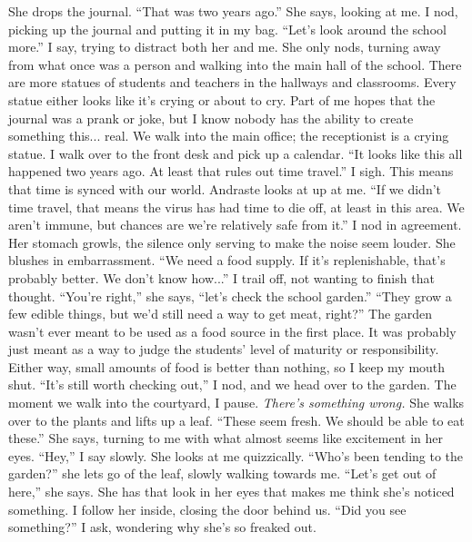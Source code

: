 \documentclass[a4paper, 12pt]{book}
\newcommand\tab[1][1cm]{\hspace*{#1}}
\begin{document}
\tab
She drops the journal. ``That was two years ago.'' She says, looking at me.
\newline
\tab
I nod, picking up the journal and putting it in my bag. ``Let’s look around the school more.'' I say, trying to distract both her and me. She only nods, turning away from what once was a person and walking into the main hall of the school. There are more statues of students and teachers in the hallways and classrooms. Every statue either looks like it’s crying or about to cry. Part of me hopes that the journal was a prank or joke, but I know nobody has the ability to create something this... real. We walk into the main office; the receptionist is a crying statue. I walk over to the front desk and pick up a calendar. ``It looks like this all happened two years ago. At least that rules out time travel.'' I sigh. This means that time is synced with our world.
\newline
\tab
Andraste looks at up at me. ``If we didn’t time travel, that means the virus has had time to die off, at least in this area. We aren’t immune, but chances are we’re relatively safe from it.'' I nod in agreement. Her stomach growls, the silence only serving to make the noise seem louder. She blushes in embarrassment.
\newline
\tab
``We need a food supply. If it’s replenishable, that’s probably better. We don’t know how...'' I trail off, not wanting to finish that thought.
\newline
\tab
``You’re right,'' she says, ``let’s check the school garden.''
\newline
\tab
``They grow a few edible things, but we’d still need a way to get meat, right?'' The garden wasn’t ever meant to be used as a food source in the first place. It was probably just meant as a way to judge the students’ level of maturity or responsibility. Either way, small amounts of food is better than nothing, so I keep my mouth shut.
\newline
\tab
``It’s still worth checking out,'' I nod, and we head over to the garden. The moment we walk into the courtyard, I pause. \textit{There’s something wrong.} She walks over to the plants and lifts up a leaf. ``These seem fresh. We should be able to eat these.'' She says, turning to me with what almost seems like excitement in her eyes.
\newline
\tab
``Hey,'' I say slowly. She looks at me quizzically. ``Who’s been tending to the garden?'' she lets go of the leaf, slowly walking towards me. ``Let’s get out of here,'' she says. She has that look in her eyes that makes me think she’s noticed something. I follow her inside, closing the door behind us. ``Did you see something?'' I ask, wondering why she’s so freaked out.
\end{document}
